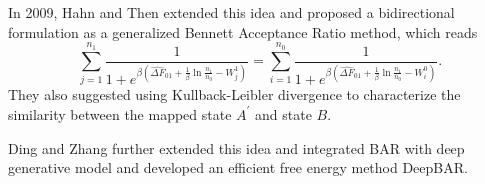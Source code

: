 In 2009, Hahn and Then extended this idea and proposed a bidirectional formulation as a generalized Bennett Acceptance Ratio method\cite{HahnPRE2009}, which reads
\begin{equation}
	\sum_{j=1}^{n_1}\frac{1}{1+e^{\beta\left(\widehat{\Delta F}_{01}+\frac{1}{\beta}\ln{\frac{n_1}{n_0}}-W_j^1\right)}}=	\sum_{i=1}^{n_0}\frac{1}{1+e^{\beta\left(\widehat{\Delta F}_{01}+\frac{1}{\beta}\ln{\frac{n_1}{n_0}}-W_i^0\right)}}.
\end{equation}
They also suggested using Kullback-Leibler divergence to characterize the similarity between the mapped state $A^\prime$ and state $B$.

Ding and Zhang further extended this idea and integrated BAR with deep generative model and developed an efficient free energy method DeepBAR.\cite{DingJPCL2021}